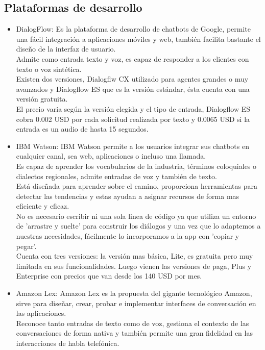 \subsection{Plataformas de desarrollo}
\begin{itemize}
    \item DialogFlow:
        Es la plataforma de desarrollo de chatbots de Google, permite una fácil integración a aplicaciones móviles y web, también facilita bastante el diseño de la interfaz de usuario.\\
        Admite como entrada texto y voz, es capaz de responder a los clientes con texto o voz sintética.\\
        Existen dos versiones, Dialogflw CX utilizado para agentes grandes o muy avanzados y Dialogflow ES que es la versión estándar, ésta cuenta con una versión gratuita.\\
        El precio varia según la versión elegida y el tipo de entrada, Dialogflow ES cobra 0.002 USD por cada solicitud realizada por texto y 0.0065 USD si la entrada es un audio de hasta 15 segundos.\cite{Dialogflow}
    \item IBM Watson:
        IBM Watson  permite a los usuarios integrar sus chatbots en cualquier canal, sea web, aplicaciones o incluso una llamada.\\
        Es capaz de aprender los vocabularios de la industria,  términos coloquiales o dialectos regionales, admite entradas de voz y también de texto. \\
        Está diseñada para aprender sobre el camino, proporciona herramientas para detectar las tendencias y estas ayudan a asignar recursos de forma mas eficiente y eficaz.\\
        No es necesario escribir ni una sola linea de código ya que utiliza un entorno de 'arrastre y suelte' para construir los diálogos y una vez que lo adaptemos a nuestras necesidades, fácilmente lo incorporamos a la app con 'copiar y pegar'.\cite{IBMCloud2020}\\
        Cuenta con tres versiones: la versión mas básica, Lite, es gratuita pero muy limitada en sus funcionalidades.
        Luego vienen las versiones de paga, Plus y Enterprise con precios que van desde los 140 USD por mes.\cite{IBM_Price}
    \item Amazon Lex:
        Amazon Lex es la propuesta del gigante tecnológico Amazon, sirve para diseñar, crear, probar e implementar interfaces de conversación en las aplicaciones.\\
        Reconoce tanto entradas de texto como de voz, gestiona el contexto de las conversaciones de forma nativa y también permite una gran fidelidad en las interacciones de habla telefónica.\\

\end{itemize}
